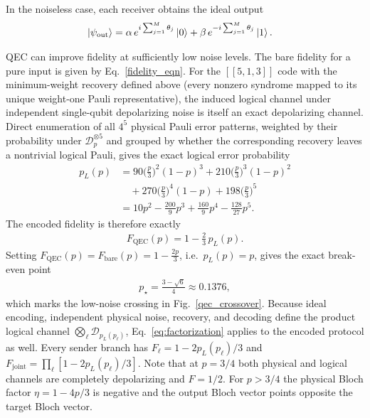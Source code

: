 \documentclass[aps,physrev,10pt,twocolumn,superscriptaddress,floatfix]{revtex4-2}
\begin{document}
In the noiseless case, each receiver obtains the ideal output
\begin{align}
\ket{\psi_{\mathrm{out}}}
&= \alpha\,e^{i\sum_{j=1}^{M}\theta_j}\ket{0} + \beta\,e^{-i\sum_{j=1}^{M}\theta_j}\ket{1}.
\end{align}

QEC can improve fidelity at sufficiently low noise levels. The bare fidelity for a pure input is given by Eq.~\eqref{fidelity_eqn}. For the $[[5,1,3]]$ code with the minimum-weight recovery defined above (every nonzero syndrome mapped to its unique weight-one Pauli representative), the induced logical channel under independent single-qubit depolarizing noise is itself an exact depolarizing channel. Direct enumeration of all $4^5$ physical Pauli error patterns, weighted by their probability under $\mathcal D_p^{\otimes 5}$ and grouped by whether the corresponding recovery leaves a nontrivial logical Pauli, gives the exact logical error probability~\cite{rahn2002exact}
\begin{align}
    p_L(p)
    &= 90\Big(\tfrac{p}{3}\Big)^{2}(1-p)^{3}
    + 210\Big(\tfrac{p}{3}\Big)^{3}(1-p)^{2} \nonumber\\
    &\quad+ 270\Big(\tfrac{p}{3}\Big)^{4}(1-p)
    + 198\Big(\tfrac{p}{3}\Big)^{5} \nonumber\\
    &= 10p^2 - \frac{200}{9}p^3 + \frac{160}{9}p^4 - \frac{128}{27}p^5.
\end{align}
The encoded fidelity is therefore exactly
\begin{align}\label{eq:pL}
    F_{\mathrm{QEC}}(p) = 1 - \frac{2}{3}\,p_L(p).
\end{align}
Setting $F_{\mathrm{QEC}}(p) = F_{\mathrm{bare}}(p) = 1-\tfrac{2p}{3}$, i.e.\ $p_L(p)=p$, gives the exact break-even point
\begin{align}
    p_\star = \frac{3-\sqrt6}{4} \approx 0.1376,
\end{align}
which marks the low-noise crossing in Fig.~\ref{qec_crossover}. Because ideal encoding, independent physical noise, recovery, and decoding define the product logical channel $\bigotimes_\ell\mathcal D_{p_L(p_\ell)}$, Eq.~\eqref{eq:factorization} applies to the encoded protocol as well. Every sender branch has $F_\ell=1-2p_L(p_\ell)/3$ and $F_{\mathrm{joint}}=\prod_\ell[1-2p_L(p_\ell)/3]$. Note that at $p=3/4$ both physical and logical channels are completely depolarizing and $F=1/2$. For $p>3/4$ the physical Bloch factor $\eta=1-4p/3$ is negative and the output Bloch vector points opposite the target Bloch vector.
\end{document}
